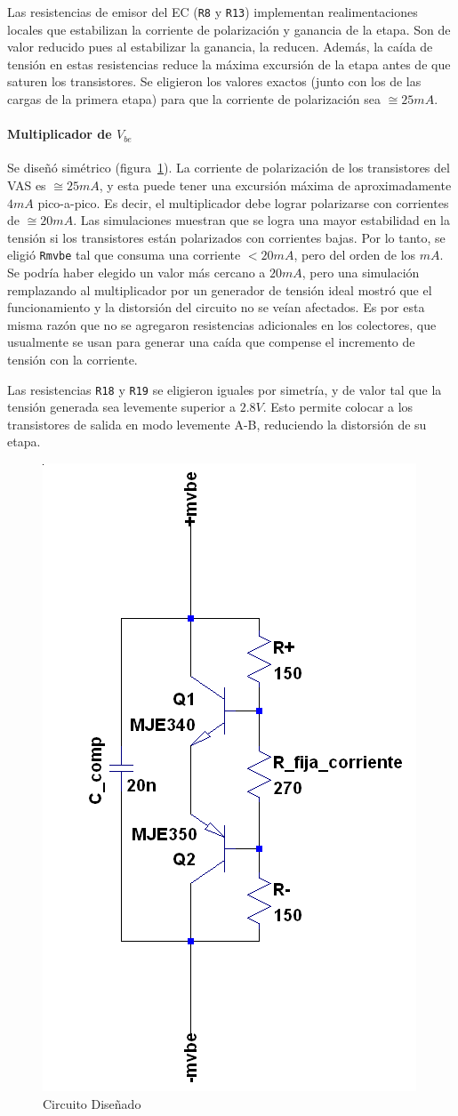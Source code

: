 \documentclass[a4paper,12pt,twoside]{article}
\begin{document}
Las resistencias de emisor del EC (\texttt{R8} y \texttt{R13}) implementan realimentaciones locales que estabilizan la corriente de polarización y ganancia de la etapa. Son de valor reducido pues al estabilizar la ganancia, la reducen. Además, la caída de tensión en estas resistencias reduce la máxima excursión de la etapa antes de que saturen los transistores. Se eligieron los valores exactos (junto con los de las cargas de la primera etapa) para que la corriente de polarización sea $\cong 25mA$.

\paragraph{Multiplicador de $V_{be}$}

Se diseñó simétrico (figura~\ref{fig:mvbe}). La corriente de polarización de los transistores del VAS es $\cong 25mA$, y esta puede tener una excursión máxima de aproximadamente $4mA$ pico-a-pico. Es decir, el multiplicador debe lograr polarizarse con corrientes de $\cong 20mA$. Las simulaciones muestran que se logra una mayor estabilidad en la tensión si los transistores están polarizados con corrientes bajas. Por lo tanto, se eligió \texttt{Rmvbe} tal que consuma una corriente $<20mA$, pero del orden de los $mA$. Se podría haber elegido un valor más cercano a $20mA$, pero una simulación remplazando al multiplicador por un generador de tensión ideal mostró que el funcionamiento y la distorsión del circuito no se veían afectados. Es por esta misma razón que no se agregaron resistencias adicionales en los colectores, que usualmente se usan para generar una caída que compense el incremento de tensión con la corriente.

Las resistencias \texttt{R18} y \texttt{R19} se eligieron iguales por simetría, y de valor tal que la tensión generada sea levemente superior a $2.8V$. Esto permite colocar a los transistores de salida en modo levemente A-B, reduciendo la distorsión de su etapa.

\begin{figure}[H]
\centering
\includegraphics[height=0.3\textwidth]{img/sim/mvbe}
\caption{Circuito Diseñado}
\label{fig:mvbe} 
\end{figure}
\end{document}
